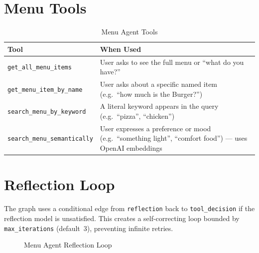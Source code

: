 \documentclass[12pt,a4paper]{report}
\begin{document}
\section{Menu Tools}\label{sec:menu-tools}

\begin{table}[H]
\centering
\caption{Menu Agent Tools}
\begin{tabularx}{\textwidth}{lX}
\toprule
\textbf{Tool} & \textbf{When Used} \\
\midrule
\texttt{get\_all\_menu\_items}       & User asks to see the full menu or ``what do you have?'' \\
\texttt{get\_menu\_item\_by\_name}   & User asks about a specific named item (e.g.\ ``how much is the Burger?'') \\
\texttt{search\_menu\_by\_keyword}   & A literal keyword appears in the query (e.g.\ ``pizza'', ``chicken'') \\
\texttt{search\_menu\_semantically}  & User expresses a preference or mood (e.g.\ ``something light'', ``comfort food'') — uses OpenAI embeddings \\
\bottomrule
\end{tabularx}
\end{table}

\section{Reflection Loop}

The graph uses a conditional edge from \texttt{reflection} back to \texttt{tool\_decision}
if the reflection model is unsatisfied. This creates a self-correcting loop bounded by
\texttt{max\_iterations} (default~3), preventing infinite retries.

\begin{figure}[H]
\centering
{}
\caption{Menu Agent Reflection Loop}
\end{figure}
\end{document}
